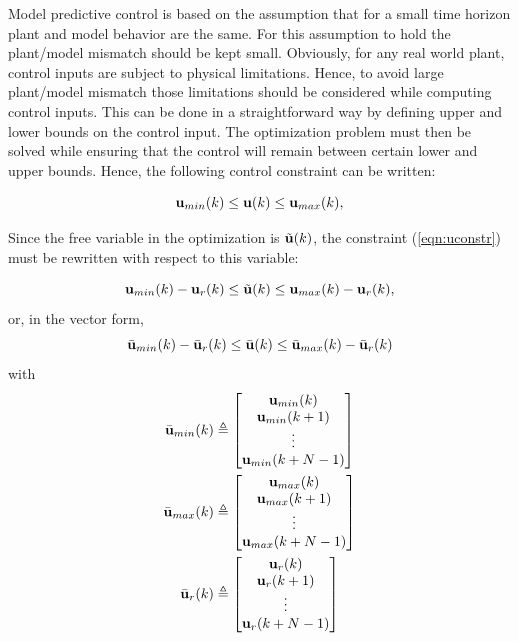 \documentclass[conference]{IEEEtran} %
\begin{document}
Model predictive control is based on the assumption that for a small time
horizon plant and model behavior are the same. For this assumption to hold
the plant/model mismatch should be kept small. Obviously, for any real
world plant, control inputs are subject to physical limitations. Hence, to
avoid large plant/model mismatch those limitations should be considered
while computing control inputs. This can be done in a straightforward way by
defining upper and lower bounds on the control input. The optimization
problem must then be solved while ensuring that the control will remain
between certain lower and upper bounds. Hence, the following control
constraint can be written:

\begin{equation}\label{eqn:uconstr}
	{\bf u}_{min}(k) \leq {\bf u}(k) \leq {\bf u}_{max}(k),
\end{equation}

Since the free variable in the optimization is $\tilde{\bf u}(k)$,
the constraint (\ref{eqn:uconstr}) must be rewritten with respect to this
variable:

\begin{equation*}
	{\bf u}_{min}(k) - {\bf u}_r(k) \leq \tilde{\bf u}(k) \leq {\bf u}_{max}(k) - {\bf u}_r(k),
\end{equation*}
or, in the vector form,
\begin{equation*}
	\bar{\bf u}_{min}(k) - \bar{\bf u}_r(k) \leq \bar{\bf u}(k) \leq \bar{\bf u}_{max}(k) - \bar{\bf u}_r(k)
\end{equation*}
\noindent with
\begin{align*}
	\bar{\bf u}_{min}(k) &\triangleq \begin{bmatrix}
		{\bf u}_{min}(k) \\ {\bf u}_{min}(k+1) \\ \vdots \\ {\bf u}_{min}(k+N-1)
	\end{bmatrix} \\
	\bar{\bf u}_{max}(k) &\triangleq \begin{bmatrix}
		{\bf u}_{max}(k) \\ {\bf u}_{max}(k+1) \\ \vdots \\ {\bf u}_{max}(k+N-1)
	\end{bmatrix} \\
	\bar{\bf u}_r(k) &\triangleq \begin{bmatrix}
		{\bf u}_r(k) \\ {\bf u}_r(k+1) \\ \vdots \\ {\bf u}_r(k+N-1)
	\end{bmatrix}
\end{align*}
\end{document}
